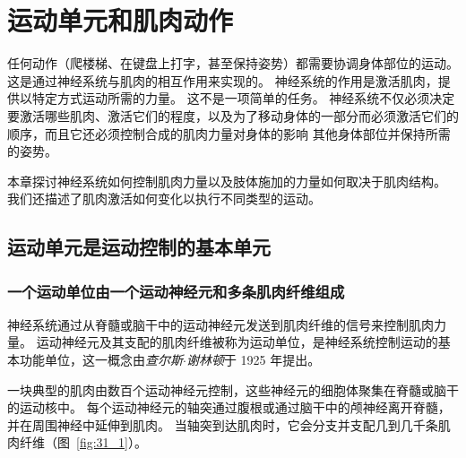 \chapter{运动单元和肌肉动作} \label{chap:chap31}

任何动作（爬楼梯、在键盘上打字，甚至保持姿势）都需要协调身体部位的运动。
这是通过神经系统与肌肉的相互作用来实现的。
神经系统的作用是激活肌肉，提供以特定方式运动所需的力量。
这不是一项简单的任务。
神经系统不仅必须决定要激活哪些肌肉、激活它们的程度，以及为了移动身体的一部分而必须激活它们的顺序，而且它还必须控制合成的肌肉力量对身体的影响 其他身体部位并保持所需的姿势。


本章探讨神经系统如何控制肌肉力量以及肢体施加的力量如何取决于肌肉结构。
我们还描述了肌肉激活如何变化以执行不同类型的运动。



\section{运动单元是运动控制的基本单元}

\subsection{一个运动单位由一个运动神经元和多条肌肉纤维组成}

神经系统通过从脊髓或脑干中的运动神经元发送到肌肉纤维的信号来控制肌肉力量。
运动神经元及其支配的肌肉纤维被称为运动单位，是神经系统控制运动的基本功能单位，这一概念由\textit{查尔斯$\cdot$谢林顿}于 1925 年提出。


一块典型的肌肉由数百个运动神经元控制，这些神经元的细胞体聚集在脊髓或脑干的运动核中。
每个运动神经元的轴突通过腹根或通过脑干中的颅神经离开脊髓，并在周围神经中延伸到肌肉。
当轴突到达肌肉时，它会分支并支配几到几千条肌肉纤维（图~\ref{fig:31_1}）。


